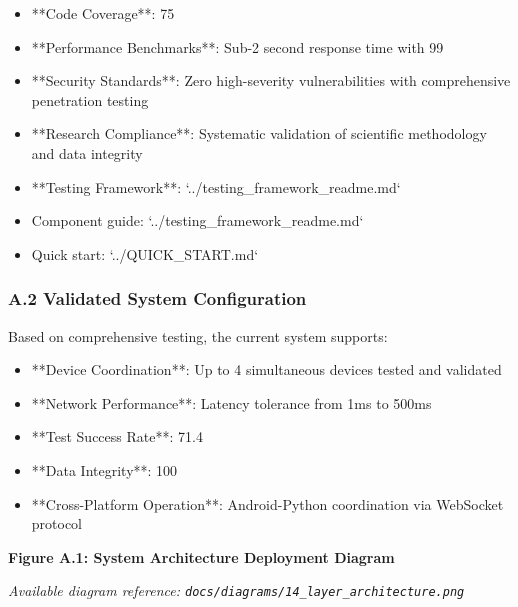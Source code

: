 \documentclass[12pt,a4paper]{article}
\begin{document}
\begin{itemize}
\item **Code Coverage**: 75%
\item **Performance Benchmarks**: Sub-2 second response time with 99%
\item **Security Standards**: Zero high-severity vulnerabilities with comprehensive penetration testing
\item **Research Compliance**: Systematic validation of scientific methodology and data integrity
\item **Testing Framework**: `../testing_framework_readme.md`
\item Component guide: `../testing_framework_readme.md`
\item Quick start: `../QUICK_START.md`

\end{itemize}
\subsubsection{A.2 Validated System Configuration}

Based on comprehensive testing, the current system supports:

\begin{itemize}
\item **Device Coordination**: Up to 4 simultaneous devices tested and validated
\item **Network Performance**: Latency tolerance from 1ms to 500ms
\item **Test Success Rate**: 71.4%
\item **Data Integrity**: 100%
\item **Cross-Platform Operation**: Android-Python coordination via WebSocket protocol

\end{itemize}
\textbf{Figure A.1: System Architecture Deployment Diagram}

\textit{Available diagram reference: \texttt{docs/diagrams/14\_layer\_architecture.png}}
\end{document}
